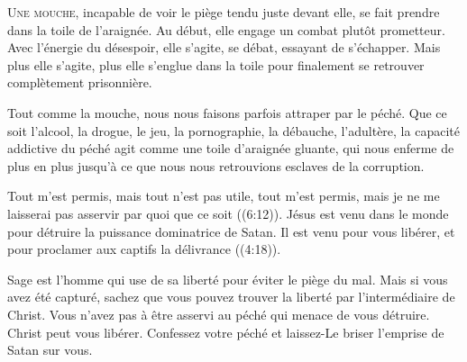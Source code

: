 




\lettrine{U}{ne mouche}, 
 incapable de voir le piège tendu juste devant elle,
 se fait prendre dans la toile de l'araignée.
 Au début, elle engage un combat plutôt prometteur.
 Avec l'énergie du désespoir, elle s'agite, se débat,
 essayant de s'échapper.
 Mais plus elle s'agite, plus elle s'englue dans la toile
 pour finalement se retrouver complètement prisonnière. 

Tout comme la mouche, nous nous faisons parfois attraper
 par le péché.
 Que ce soit l'alcool, la drogue, le jeu, la pornographie,
 la débauche, l'adultère, la capacité addictive du péché
 agit comme une toile d'araignée gluante, qui nous enferme
 de plus en plus jusqu'à ce que nous nous retrouvions
 esclaves de la corruption. 


\Og Tout m'est permis, mais tout n'est pas utile,
 tout m'est permis, mais je ne me laisserai pas asservir
 par quoi que ce soit \Fg{} ((6:12)).
 Jésus est venu dans le monde pour détruire
 la puissance dominatrice de Satan.
 Il est venu pour vous libérer,
 et \Og pour proclamer aux captifs la délivrance \Fg{} ((4:18)).

Sage est l'homme qui use de sa liberté pour éviter le piège du mal.
 Mais si vous avez été capturé, sachez que vous pouvez trouver la liberté
 par l'intermédiaire de Christ.
 Vous n'avez pas à être asservi au péché qui menace de vous détruire.
 Christ peut vous libérer. Confessez votre péché et laissez-Le briser
 l'emprise de Satan sur vous. 

\dvrule



